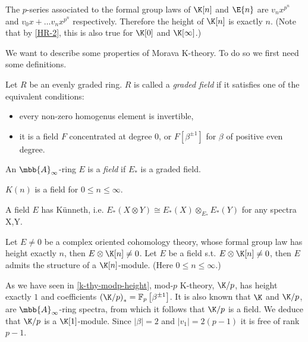 \begin{corollary}\label{k-e-p-series}
	The $p$-series associated to the formal group laws of $\K[n]$ and $\E{n}$ are $v_n x^{p^n}$ and $v_0 x + \dotsc v_n x^{p^n}$ respectively.
	Therefore the height of $\K[n]$ is exactly $n$.
	(Note that by \ref{HR-2}, this is also true for $\K[0]$ and $\K[\infty]$.)
\end{corollary}

We want to describe some properties of Morava K-theory.
To do so we first need some definitions.

\begin{definition}
	Let $R$ be an evenly graded ring.
	$R$ is called a \emph{graded field} if it satisfies one of the equivalent conditions:
	\begin{itemize}
		\item every non-zero homogenus element is invertible,
		\item it is a field $F$ concentrated at degree 0, or $F\left[\beta^{\pm1}\right]$ for $\beta$ of positive even degree.
	\end{itemize}
	An $\mbb{A}_\infty$-ring $E$ is a \emph{field} if $E_*$ is a graded field.
\end{definition}

\begin{example}
	$K\left(n\right)$ is a field for $0 \leq n \leq \infty$.
\end{example}

\begin{proposition}
	A field $E$ has K\"unneth, i.e. $E_*\left(X\otimes Y\right)\cong E_*\left(X\right)\otimes_{E_*}E_*\left(Y\right)$ for any spectra X,Y.
\end{proposition}

\begin{proposition}
	Let $E \neq 0$ be a complex oriented cohomology theory, whose formal group law has height exactly $n$, then $E \otimes \K[n] \neq 0$.
	Let $E$ be a field s.t. $E \otimes \K[n] \neq 0$, then $E$ admits the structure of a $\K[n]$-module.
	(Here $0 \leq n \leq \infty$.)
\end{proposition}

\begin{example}\label{k-thy-modp-morava}
	As we have seen in \ref{k-thy-modp-height}, mod-$p$ K-theory, $\K/p$, has height exactly $1$ and coefficients $\left(\K/p\right)_* = \mathbb{F}_p \left[\beta^{\pm 1}\right]$.
	It is also known that $\K$ and $\K/p$, are $\mbb{A}_\infty$-ring spectra, from which it follows that $\K/p$ is a field.
	We deduce that $\K/p$ is a $\K[1]$-module.
	Since $\left|\beta\right| = 2$ and $\left|v_1\right| = 2\left(p-1\right)$ it is free of rank $p-1$.
\end{example}

